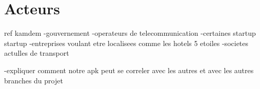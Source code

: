 \section{Acteurs}
ref kamdem
-gouvernement
-operateurs de telecommunication
-certaines startup startup
-entreprises voulant etre localisees comme les hotels 5 etoiles 
-societes actulles de transport

-expliquer comment notre apk peut se correler avec les autres et avec les autres branches du projet
